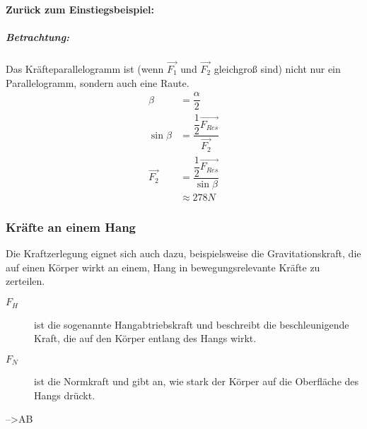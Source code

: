 \documentclass[12pt]{article}
\numberwithin{equation}{subsection}
\begin{document}
	\paragraph{Zurück zum Einstiegsbeispiel:}
	\subparagraph{Betrachtung:}
	Das Kräfteparallelogramm ist (wenn $ \vec{F_1} $ und $ \vec{F_2} $ gleichgroß sind) nicht nur ein Parallelogramm, sondern auch eine Raute.
	\begin{subequations}
		\begin{align}
			\beta &= \dfrac{\alpha}{2}\\
			\sin\beta &= \dfrac{\dfrac{1}{2}\vec{F_{Res}}}{\vec{F_2}}\\
			\vec{F_2} &= \dfrac{\dfrac{1}{2}\vec{F_{Res}}}{\sin\beta}\\
			& \approx 278N
		\end{align}
	\end{subequations}
	
	\subsubsection{Kräfte an einem Hang}
	Die Kraftzerlegung eignet sich auch dazu, beispielsweise die Gravitationskraft, die auf einen Körper wirkt an einem, Hang in bewegungsrelevante Kräfte zu zerteilen.
	\begin{description}
		\item[$ F_H $] ist die sogenannte Hangabtriebskraft und beschreibt die beschleunigende Kraft, die auf den Körper entlang des Hangs wirkt.
		\item[$ F_N $] ist die Normkraft und gibt an, wie stark der Körper auf die Oberfläche des Hangs drückt.
	\end{description}
	-->AB
\end{document}
